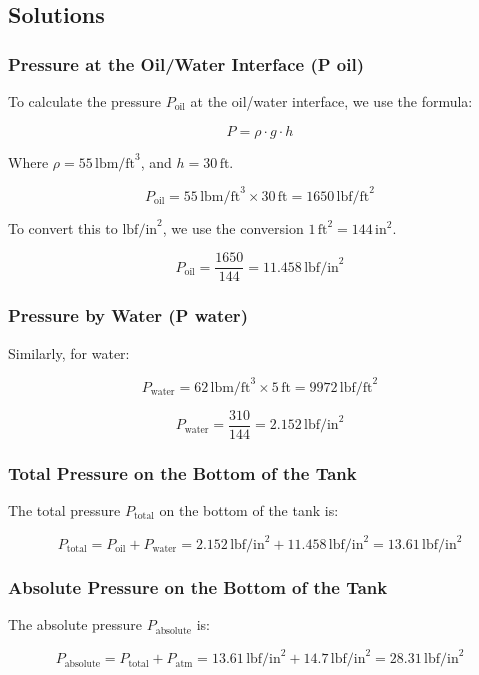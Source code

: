 \documentclass{article}
\begin{document}
\subsection*{Solutions}

\subsubsection*{Pressure at the Oil/Water Interface (P oil)}
To calculate the pressure \(P_{\text{oil}}\) at the oil/water interface, we use the formula:

\[
P = \rho \cdot g \cdot h
\]

Where \( \rho = 55 \, \text{lbm/ft}^3 \), and \( h = 30 \, \text{ft} \).

\[
P_{\text{oil}} = 55 \, \text{lbm/ft}^3 \times 30 \, \text{ft} = 1650 \, \text{lbf/ft}^2
\]

To convert this to \( \text{lbf/in}^2 \), we use the conversion \(1 \, \text{ft}^2 = 144 \, \text{in}^2\).

\[
P_{\text{oil}} = \frac{1650}{144} = 11.458 \, \text{lbf/in}^2
\]

\subsubsection*{Pressure by Water (P water)}
Similarly, for water:

\[
P_{\text{water}} = 62 \, \text{lbm/ft}^3 \times 5 \, \text{ft} = 9972 \, \text{lbf/ft}^2
\]

\[
P_{\text{water}} = \frac{310}{144} = 2.152 \, \text{lbf/in}^2
\]

\subsubsection*{Total Pressure on the Bottom of the Tank}
The total pressure \( P_{\text{total}} \) on the bottom of the tank is:

\[
P_{\text{total}} = P_{\text{oil}} + P_{\text{water}} = 2.152 \, \text{lbf/in}^2 + 11.458 \, \text{lbf/in}^2 = 13.61 \, \text{lbf/in}^2
\]

\subsubsection*{Absolute Pressure on the Bottom of the Tank}
The absolute pressure \( P_{\text{absolute}} \) is:

\[
P_{\text{absolute}} = P_{\text{total}} + P_{\text{atm}} = 13.61 \, \text{lbf/in}^2 + 14.7 \, \text{lbf/in}^2 = 28.31 \, \text{lbf/in}^2
\]
\newpage
\end{document}
